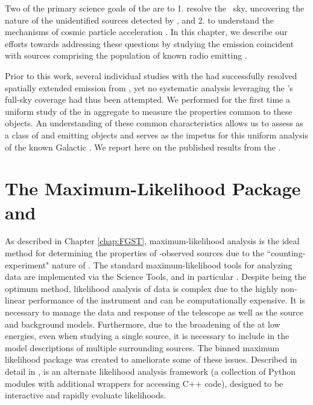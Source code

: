 {Two of the primary science goals of the \lat{}  are to 1. resolve the \gam~sky, uncovering the nature of the unidentified sources detected by \egret{}, and 2. to understand the mechanisms of cosmic particle acceleration \citep{atwood09}. In this chapter, we describe our efforts towards addressing these questions by studying the \gam{} emission coincident with sources comprising the population of known radio emitting \snrs{}.

Prior to this work, several individual studies with the \lat{} had successfully resolved spatially extended emission from \snrs{} \citep[and references therein]{3FGL}, yet no systematic analysis leveraging the \lat{}'s full-sky coverage had thus been attempted. We performed for the first time a uniform study of the \snrs{} in aggregate to measure the properties common to these objects. An understanding of these common characteristics allows us to assess \snrs{} as a class of \gam{} and \cray{} emitting objects and serves as the impetus for this uniform analysis of the known Galactic \snrs{}. We  report here on the published results from the \snrcat{} \citep{snrCat}.
 


\section{\label{snrCat:ptlk}The \ptlike{} Maximum-Likelihood Package and \srcs{}}

As described in Chapter \ref{chap:FGST}, maximum-likelihood analysis is the ideal method for determining the properties of \lat{}-observed sources due to the ``counting-experiment" nature of \FermiLat{}. The standard maximum-likelihood tools for analyzing \lat{} data are implemented via the \Fermi{} Science Tools, and in particular \gtlike{}.  Despite being the optimum method, likelihood analysis of \lat{} data is complex due to the highly non-linear performance of the instrument and can be computationally expensive. It is necessary to manage the data and response of the telescope as well as the source and background models. Furthermore, due to the broadening of the \psf{} at low energies, even when studying a single source, it is necessary to include in the model descriptions of multiple surrounding sources. The \ptlike{} binned maximum likelihood package was created to ameliorate some of these issues. Described in detail in \cite{Kerr10}, \ptlike{} is an alternate likelihood analysis framework (a collection of Python modules with additional wrappers for accessing C++ code), designed to be interactive and rapidly evaluate likelihoods.  

}
